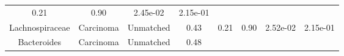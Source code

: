 \documentclass[12pt,]{article}
\begin{document}
\begin{longtable}[]{@{}cccccccc@{}}
\begin{minipage}[t]{0.14\columnwidth}
0.21\strut
\end{minipage} & \begin{minipage}[t]{0.14\columnwidth}\centering\strut
0.90\strut
\end{minipage} & \begin{minipage}[t]{0.06\columnwidth}\centering\strut
2.45e-02\strut
\end{minipage} & \begin{minipage}[t]{0.06\columnwidth}\centering\strut
2.15e-01\strut
\end{minipage}\tabularnewline
\begin{minipage}[t]{0.18\columnwidth}\centering\strut
Lachnospiraceae\strut
\end{minipage} & \begin{minipage}[t]{0.07\columnwidth}\centering\strut
Carcinoma\strut
\end{minipage} & \begin{minipage}[t]{0.09\columnwidth}\centering\strut
Unmatched\strut
\end{minipage} & \begin{minipage}[t]{0.03\columnwidth}\centering\strut
0.43\strut
\end{minipage} & \begin{minipage}[t]{0.14\columnwidth}\centering\strut
0.21\strut
\end{minipage} & \begin{minipage}[t]{0.14\columnwidth}\centering\strut
0.90\strut
\end{minipage} & \begin{minipage}[t]{0.06\columnwidth}\centering\strut
2.52e-02\strut
\end{minipage} & \begin{minipage}[t]{0.06\columnwidth}\centering\strut
2.15e-01\strut
\end{minipage}\tabularnewline
\begin{minipage}[t]{0.18\columnwidth}\centering\strut
Bacteroides\strut
\end{minipage} & \begin{minipage}[t]{0.07\columnwidth}\centering\strut
Carcinoma\strut
\end{minipage} & \begin{minipage}[t]{0.09\columnwidth}\centering\strut
Unmatched\strut
\end{minipage} & \begin{minipage}[t]{0.03\columnwidth}\centering\strut
0.48\strut
\end{minipage} & \begin{minipage}[t]{0.14\columnwidth}\centering\strut

\end{minipage}
\end{longtable}
\end{document}

